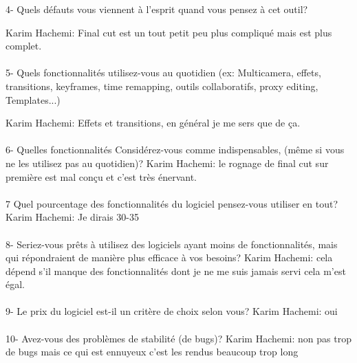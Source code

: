 4- Quels défauts vous viennent à l'esprit quand vous pensez à cet outil?

Karim Hachemi: Final cut est un tout petit peu plus compliqué mais
est plus complet.


\paragraph{}
5-  Quels fonctionnalités utilisez-vous au quotidien (ex: Multicamera, effets,
transitions, keyframes, time remapping, outils collaboratifs, proxy
editing, Templates...)

Karim Hachemi: Effets et transitions, en général je me sers que de ça.

\paragraph{}
6-  Quelles fonctionnalités Considérez-vous comme indispensables, (même si vous
ne les utilisez pas au quotidien)?
Karim Hachemi: le rognage de final cut sur première est mal conçu et c'est très
énervant.

\paragraph{}
7 Quel pourcentage des fonctionnalités du logiciel pensez-vous utiliser
en tout?
Karim Hachemi: Je dirais 30-35%

\paragraph{}
8- Seriez-vous prêts à utilisez des logiciels ayant moins de fonctionnalités,
mais qui répondraient de manière plus efficace à vos besoins?
Karim Hachemi: cela dépend s'il manque des fonctionnalités dont je ne me
suis jamais servi cela m'est égal.

\paragraph{}
9-  Le prix du logiciel est-il un critère de choix selon vous?
Karim Hachemi: oui

\paragraph{}
10- Avez-vous des problèmes de stabilité (de bugs)?
Karim Hachemi: non pas trop de bugs mais ce qui est ennuyeux c'est les
rendus beaucoup trop long


